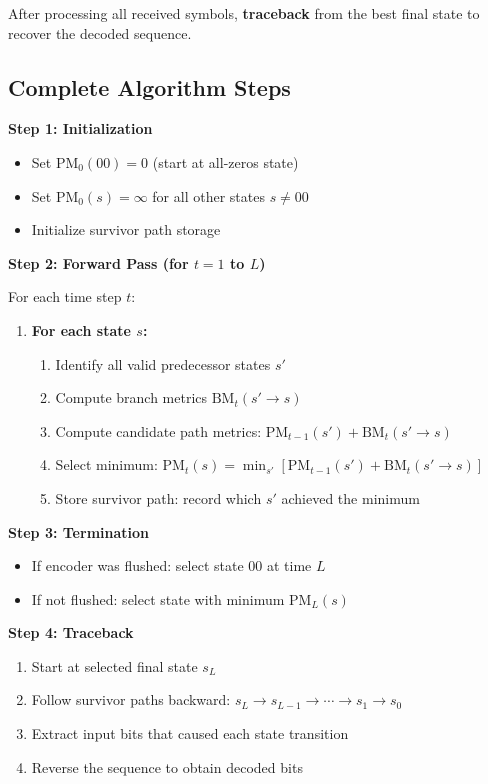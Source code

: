 After processing all received symbols, \textbf{traceback} from the best final state to recover the decoded sequence.

\subsection{Complete Algorithm Steps}

\textbf{Step 1: Initialization}
\begin{itemize}
\item Set $\text{PM}_0(00) = 0$ (start at all-zeros state)
\item Set $\text{PM}_0(s) = \infty$ for all other states $s \neq 00$
\item Initialize survivor path storage
\end{itemize}

\textbf{Step 2: Forward Pass (for $t = 1$ to $L$)}

For each time step $t$:
\begin{enumerate}
\item \textbf{For each state $s$:}
   \begin{enumerate}
   \item Identify all valid predecessor states $s'$
   \item Compute branch metrics $\text{BM}_t(s' \to s)$
   \item Compute candidate path metrics: $\text{PM}_{t-1}(s') + \text{BM}_t(s' \to s)$
   \item Select minimum: $\text{PM}_t(s) = \min_{s'} [\text{PM}_{t-1}(s') + \text{BM}_t(s' \to s)]$
   \item Store survivor path: record which $s'$ achieved the minimum
   \end{enumerate}
\end{enumerate}

\textbf{Step 3: Termination}
\begin{itemize}
\item If encoder was flushed: select state 00 at time $L$
\item If not flushed: select state with minimum $\text{PM}_L(s)$
\end{itemize}

\textbf{Step 4: Traceback}
\begin{enumerate}
\item Start at selected final state $s_L$
\item Follow survivor paths backward: $s_L \to s_{L-1} \to \cdots \to s_1 \to s_0$
\item Extract input bits that caused each state transition
\item Reverse the sequence to obtain decoded bits
\end{enumerate}

